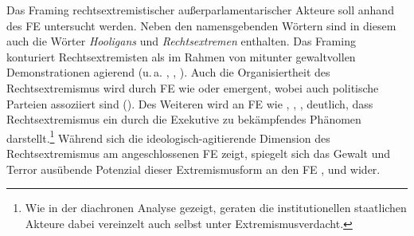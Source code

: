 Das Framing rechtsextremistischer außerparlamentarischer Akteure soll anhand des FE  untersucht werden. Neben den namensgebenden Wörtern sind in diesem auch die Wörter \emph{Hooligans} und \emph{Rechtsextremen} enthalten. Das Framing konturiert Rechtsextremisten als im Rahmen von mitunter gewaltvollen Demonstrationen agierend (u.\,a. , , ). Auch die Organisiertheit des Rechtsextremismus wird durch FE wie  oder  emergent, wobei auch politische Parteien assoziiert sind (). Des Weiteren wird an FE wie , , ,  deutlich, dass Rechtsextremismus ein durch die Exekutive zu bekämpfendes Phänomen darstellt.\footnote{Wie in der diachronen Analyse gezeigt, geraten die institutionellen staatlichen Akteure dabei vereinzelt auch selbst unter Extremismusverdacht.} Während sich die ideologisch-agitierende Dimension des Rechtsextremismus am angeschlossenen FE  zeigt, spiegelt sich das Gewalt und Terror ausübende Potenzial dieser Extremismusform an den FE ,  und  wider.

